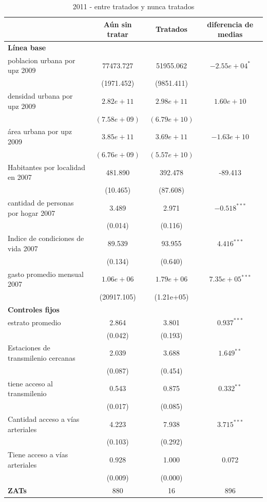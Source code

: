 \documentclass{article}
\begin{document}
\begin{table} [H]
  \centering
  \caption{2011 - entre tratados y nunca tratados}
  \label{tab:comparacion_2011}
  \begin{tabular}{l c c c}
    \toprule
    & \textbf{Aún sin tratar} & \textbf{Tratados} & \textbf{diferencia de medias} \\
    \midrule
    \multicolumn{4}{l}{\textbf{Línea base}} \\
    \midrule
    poblacion urbana por upz 2009 & 77473.727 & 51955.062 & $-2.55e+04^{*}$ \\
    & (1971.452) & (9851.411) & \\
    densidad urbana por upz 2009 & $2.82e+11$ & $2.98e+11$ & $1.60e+10$ \\
    & $(7.58e+09)$ & $(6.79e+10)$ & \\
    área urbana por upz 2009 & $3.85e+11$ & $3.69e+11$ & $-1.63e+10$ \\
    & $(6.76e+09)$ & $(5.57e+10)$ & \\
    Habitantes por localidad en 2007 & 481.890 & 392.478 & -89.413 \\
    & (10.465) & (87.608) & \\
    cantidad de personas por hogar 2007 & 3.489 & 2.971 & $-0.518^{***}$ \\
    & (0.014) & (0.116) & \\
    Indice de condiciones de vida 2007 & 89.539 & 93.955 & $4.416^{***}$ \\
    & (0.134) & (0.640) & \\
    gasto promedio mensual 2007 & $1.06e+06$ & $1.79e+06$ & $7.35e+05^{***}$ \\
    & (20917.105) & (1.21e+05) & \\
    \midrule
    \multicolumn{4}{l}{\textbf{Controles fijos}} \\
    \midrule
    estrato promedio & 2.864 & 3.801 & $0.937^{***}$ \\
    & (0.042) & (0.193) & \\
    Estaciones de transmilenio cercanas & 2.039 & 3.688 & $1.649^{**}$ \\
    & (0.087) & (0.454) & \\
    tiene acceso al transmilenio & 0.543 & 0.875 & $0.332^{**}$ \\
    & (0.017) & (0.085) & \\
    Cantidad acceso a vías arteriales & 4.223 & 7.938 & $3.715^{***}$ \\
    & (0.103) & (0.292) & \\
    Tiene acceso a vías arteriales & 0.928 & 1.000 & 0.072 \\
    & (0.009) & (0.000) & \\

    \midrule
    \textbf{ZATs} & 880 & 16 & 896 \\
    \bottomrule
  \end{tabular}
\end{table}
\end{document}
